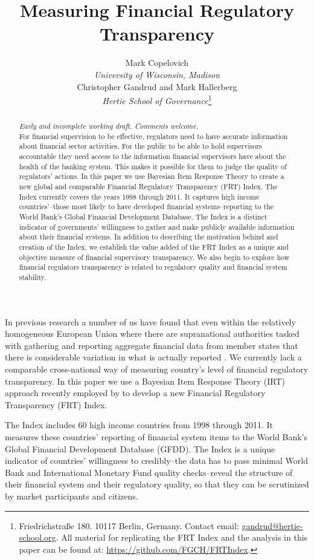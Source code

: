 \documentclass[a4paper]{article}
\title{Measuring Financial Regulatory Transparency}
\author{Mark Copelovich \\ \emph{University of Wisconsin, Madison} \\[0.5cm] Christopher Gandrud and Mark Hallerberg \\ 
    {\emph{Hertie School of Governance}}\footnote{Friedrichstra{\ss}e 180. 10117 Berlin, Germany. Contact email: \href{mailto:gandrud@hertie-school.org}{gandrud@hertie-school.org}. All material for replicating the FRT Index and the analysis in this paper can be found at: \url{https://github.com/FGCH/FRTIndex}.}}
\begin{document}
\maketitle

\begin{abstract}
\noindent \emph{Early and incomplete working draft. Comments welcome.} \\
    For financial supervision to be effective, regulators need to have accurate information about financial sector activities. For the public to be able to hold supervisors accountable they need access to the information financial supervisors have about the health of the banking system. This makes it possible for them to judge the quality of regulators' actions. In this paper we use Bayesian Item Response Theory to create a new global and comparable Financial Regulatory Transparency (FRT) Index. The Index currently covers the years 1998 through 2011. It captures high income countries'--those most likely to have developed financial systems--reporting to the World Bank's Global Financial Development Database. The Index is a distinct indicator of governments' willingness to gather and make publicly available information about their financial systems. In addition to describing the motivation behind and creation of the Index, we establish the value added of the FRT Index as a unique and objective measure of financial supervisory transparency. We also begin to explore how financial regulators transparency is related to regulatory quality and financial system stability.  
\end{abstract}

In previous research a number of us have found that even within the relatively homogeneous European Union where there are supranational authorities tasked with gathering and reporting aggregate financial data from member states that there is considerable variation in what is actually reported \cite[see][]{Gandrud2014a}. We currently lack a comparable cross-national way of measuring country's level of financial regulatory transparency. In this paper we use a Bayesian Item Response Theory (IRT) approach recently employed by \cite{Hollyer2014} to develop a new Financial Regulatory Transparency (FRT) Index. 

The Index includes 60 high income countries from 1998 through 2011. It measures these countries' reporting of financial system items to the World Bank's Global Financial Development Database (GFDD). The Index is a unique indicator of countries' willingness to credibly--the data has to pass minimal World Bank and International Monetary Fund quality checks--reveal the structure of their financial system and their regulatory quality, so that they can be scrutinized by market participants and citizens.
\end{document}
